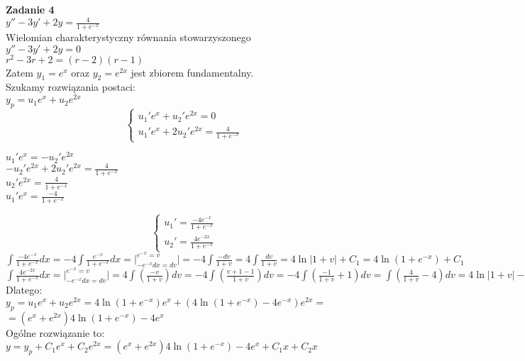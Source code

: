 \documentclass[10pt,a4paper]{article}
\begin{document}
 	\textbf{Zadanie 4} \\
 	$y'' - 3y' + 2y = \frac{4}{1+e^{-x}}$ \\
 	Wielomian charakterystyczny równania stowarzyszonego \\
 	$y'' - 3y' + 2y = 0$ \\	
 	$r^2 - 3r + 2 = (r - 2)(r - 1)$ \\	
 	Zatem $ y_{1} = e^x$ oraz $y_{2} = e^{2x} $ jest zbiorem fundamentalny. \\
 	Szukamy rozwiązania postaci: \\
 	$y_{p} = u_{1}e^x + u_{2}e^{2x} $ \\
 	$$ 
 	\left\{ \begin{array}{l}
 	u_{1}'e^x + u_{2}'e^{2x} = 0 \\
    u_{1}'e^x + 2u_{2}'e^{2x} = \frac{4}{1 + e^{-x}} 
 	\end{array}\right. 
 	$$
 	\begin{center}
 	$u_{1}'e^x = - u_{2}'e^{2x} $ \\
 	$-u_{2}'e^{2x} + 2u_{2}'e^{2x} = \frac{4}{1 + e^{-x}} $ \\
 	$u_{2}'e^{2x} = \frac{4}{1 + e^{-x}} $  \\
 	$u_{1}'e^{x} = \frac{ - 4}{1 + e^{-x}} $ \\
 	\end{center}
 
	$$ 
	\left\{ \begin{array}{l}
	u_{1}' = \frac{-4e^{-x}}{1 + e^{-x}} \\
    u_{2}' = \frac{ 4e^{-2x}}{1 + e^{-x}}
	\end{array}\right.
	$$
	$\int \frac{-4e^{-x}}{1 + e^{-x}} dx = -4 \int \frac{e^{-x}}{1 + e^{-x}} dx = \Big|_{-e^{-x}dx = dv}^{e^{-x} = v}  \Big|  = -4 \int \frac{-dv}{1+v} = 4 \int \frac{dv}{1+v} = 4\ln|1+v| + C_{1}= 4\ln(1+e^{-x}) + C_{1} $ \\
	$\int \frac{4e^{-2x}}{1 + e^{-x}} dx= \Big|_{-e^{-x}dx = dv}^{e^{-x} = v}  \Big|  = 4 \int (\frac{-v }{1+v}) dv = -4 \int (\frac{v +1 -1 }{1+v}) dv = -4 \int (\frac{-1}{1 + v} + 1) dv = \int (\frac{4}{1 + v} - 4 )dv= 4\ln|1+v| - 4v+ C_{1}= 4\ln(1+e^{-x}) -4e^{-x} + C_{2} $ \\
	Dlatego: \\
	$y_{p} = u_{1}e^x + u_{2} e^{2x} = 4\ln(1+e^{-x})e^x + (4\ln(1+e^{-x}) -4e^{-x})e^{2x} =$ \\$ = (e^x + e^{2x})4\ln(1 + e^{-x}) - 4e^{x} $ \\
	Ogólne rozwiązanie to: \\
	$y = y_{p} + C_{1}e^{x} + C_{2}e^{2x} = (e^x + e^{2x})4\ln(1 + e^{-x}) - 4e^{x} + C_{1}x + C_{2}x  $
	
\end{document}
